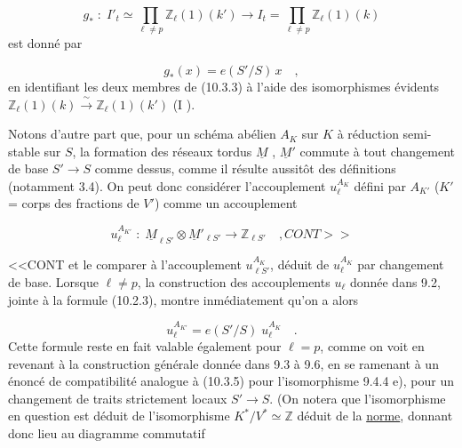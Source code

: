 \begin{equation}\tag{10.3.3}
g_* \; : \; I'_t \simeq \prod_{\ell \neq p} \mathbb{Z}_\ell(1)(k') \longrightarrow I_t = \prod_{\ell \neq p} \mathbb{Z}_\ell(1)(k)
\end{equation}
est donné par

\begin{equation}\tag{10.3.4}
g_*(x) = e(S'/S)\, x \quad ,
\end{equation}
en identifiant les deux membres de (10.3.3) à l'aide des isomorphismes évidents $\mathbb{Z}_\ell(1)(k) \xrightarrow{\ \sim\ } \mathbb{Z}_\ell(1)(k')$ (I \qquad ).

Notons d'autre part que, pour un schéma abélien $A_K$ sur $K$ à réduction semi-stable sur $S$, la formation des réseaux tordus $\underline{M}$ , $\underline{M}'$ commute à tout changement de base $S' \longrightarrow S$ comme dessus, comme il résulte aussitôt des définitions (notamment 3.4). On peut donc considérer l'accouplement $u_\ell^{A_K}$ défini par $A_{K'}$ ($K'$ = corps des fractions de $V'$) comme un accouplement

\begin{equation*}
u_\ell^{A_{K'}} \; : \; \underline{M}_{\ell S'} \otimes \underline{M}'_{\ell S'} \longrightarrow \mathbb{Z}_{\ell S'} \quad , CONT>>
\end{equation*}


<<CONT et le comparer à l'accouplement $u_{\ell S'}^{A_K}$, déduit de $u_\ell^{A_K}$ par changement de base. Lorsque $\ell \neq p$, la construction des accouplements $u_\ell$ donnée dans 9.2, jointe à la formule (10.2.3), montre inmédiatement qu'on a alors

\begin{equation}\tag{10.3.5}
u_\ell^{A_{K'}} = e(S'/S) \; u_\ell^{A_K} \quad .
\end{equation}
Cette formule reste en fait valable également pour $\ell = p$, comme on voit en revenant à la construction générale donnée dans 9.3 à 9.6, en se ramenant à un énoncé de compatibilité analogue à (10.3.5) pour l'isomorphisme 9.4.4 e), pour un changement de traits strictement locaux $S' \longrightarrow S$. (On notera que l'isomorphisme en question est déduit de l'isomorphisme $K^*/V^* \simeq \mathbb{Z}$ déduit de la \underline{norme}, donnant donc lieu au diagramme commutatif

